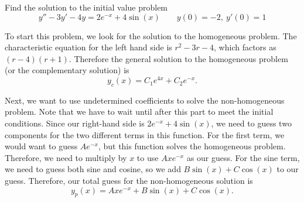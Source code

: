 \begin{example}
Find the solution to the initial value problem
\begin{equation*}
y'' - 3y' - 4y = 2e^{-x} + 4 \sin(x) \qquad y(0) = -2,\ y'(0) = 1
\end{equation*}
\end{example}

\begin{exampleSol}
To start this problem, we look for the solution to the homogeneous problem. The characteristic equation for the left hand side is $r^2 - 3r - 4$, which factors as $(r-4)(r+1)$. Therefore the general solution to the homogeneous problem (or the complementary solution) is 
\begin{equation*}
y_c(x) = C_1e^{4x} + C_2e^{-x} .
\end{equation*} 

Next, we want to use undetermined coefficients to solve the non-homogeneous problem. Note that we have to wait until after this part to meet the initial conditions. Since our right-hand side is $2e^{-x} + 4 \sin(x)$, we need to guess two components for the two different terms in this function. For the first term, we would want to guess $Ae^{-x}$, but this function solves the homogeneous problem. Therefore, we need to multiply by $x$ to use $Axe^{-x}$ as our guess. For the sine term, we need to guess both sine and cosine, so we add $B\sin(x) + C\cos(x)$ to our guess. Therefore, our total guess for the non-homogeneous solution is
\begin{equation*}
y_p(x) = Axe^{-x} + B\sin(x) + C\cos(x).
\end{equation*}


\end{exampleSol}

